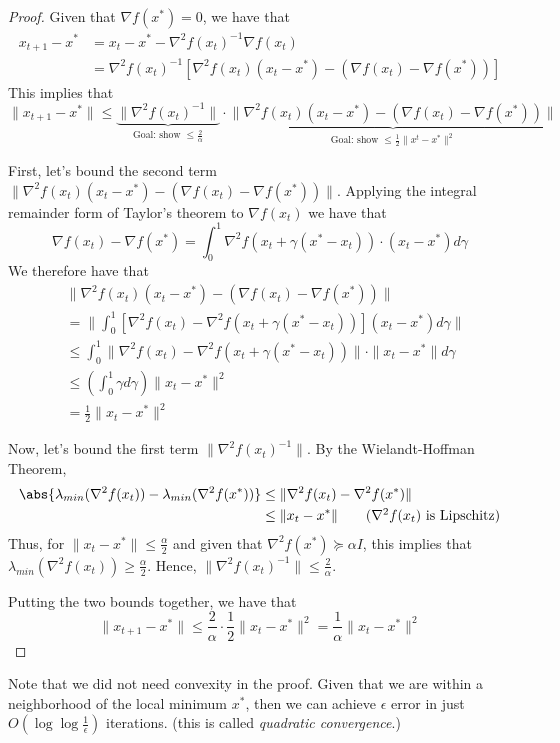 \begin{proof}
Given that $\nabla f(x^*) = 0$, we have that
\begin{align*}
x_{t+1} - x^* &= x_t - x^* - \nabla^2 f(x_t)^{-1} \nabla f(x_t) \\
&= \nabla^2 f(x_t)^{-1} [\nabla^2 f(x_t)(x_t - x^*) - (\nabla f(x_t) - \nabla f(x^*))]
\end{align*}
This implies that
$$\|x_{t+1} - x^* \| \leq \underbrace{\| \nabla^2 f(x_t)^{-1} \|}_{\text{Goal: show $\leq \frac{2}{\alpha}$}} \cdot \underbrace{\|\nabla^2 f(x_t)(x_t - x^*) - (\nabla f(x_t) - \nabla f(x^*))\|}_{\text{Goal: show $\leq \frac{1}{2} \| x^t - x^* \|^2$}}$$

First, let's bound the second term $\|\nabla^2 f(x_t)(x_t - x^*) - (\nabla f(x_t) - \nabla f(x^*))\|$.
Applying the integral remainder form of Taylor's theorem to $\nabla f(x_t)$ we have that
$$\nabla f(x_t) - \nabla f(x^*) = \int_{0}^{1} \nabla^2 f(x_t + \gamma (x^* - x_t)) \cdot (x_t - x^*) d\gamma$$
We therefore have that
\begin{align*}
&\|\nabla^2 f(x_t)(x_t - x^*) - (\nabla f(x_t) - \nabla f(x^*))\| \\
&= \|\int_{0}^{1} [\nabla^2 f(x_t) - \nabla^2 f(x_t + \gamma (x^* - x_t))](x_t - x^*) d\gamma \| \\
&\leq \int_{0}^{1} \|\nabla^2 f(x_t) - \nabla^2 f(x_t + \gamma (x^* - x_t))\| \cdot \|x_t - x^*\| d\gamma \\
&\leq \left( \int_{0}^{1} \gamma d\gamma \right) \|x_t - x^*\|^2 \tag{$\nabla^2 f(x_t)$ is Lipschitz}\\
&= \frac{1}{2}\|x_t - x^*\|^2
\end{align*}

Now, let's bound the first term $\|\nabla^2 f(x_t)^{-1}\|$. By the Wielandt-Hoffman Theorem,
\begin{align*}
\abs{\lambda_{min}(\nabla^2 f(x_t)) - \lambda_{min}(\nabla^2 f(x^*))} &\leq \|\nabla^2 f(x_t) - \nabla^2 f(x^*) \| \\
&\leq \|x_t - x^*\| \tag{$\nabla^2 f(x_t)$ is Lipschitz}
\end{align*}
Thus, for $\|x_t - x^*\| \leq \frac{\alpha}{2}$ and given that $\nabla^2 f(x^*) \succeq \alpha I$, this implies that $\lambda_{min}(\nabla^2 f(x_t)) \geq \frac{\alpha}{2}$. Hence, $\| \nabla^2 f(x_t)^{-1} \| \leq \frac{2}{\alpha}$.

Putting the two bounds together, we have that
$$\|x_{t+1} - x^*\| \leq \frac{2}{\alpha} \cdot \frac{1}{2} \|x_t - x^*\|^2 = \frac{1}{\alpha} \|x_t - x^*\|^2$$
\end{proof}
Note that we did not need convexity in the proof. Given that we are within a neighborhood of the local minimum $x^*$, then we can achieve $\epsilon$ error in just $O(\log \log \frac{1}{\epsilon})$ iterations. (this is called \emph{quadratic convergence}.)

